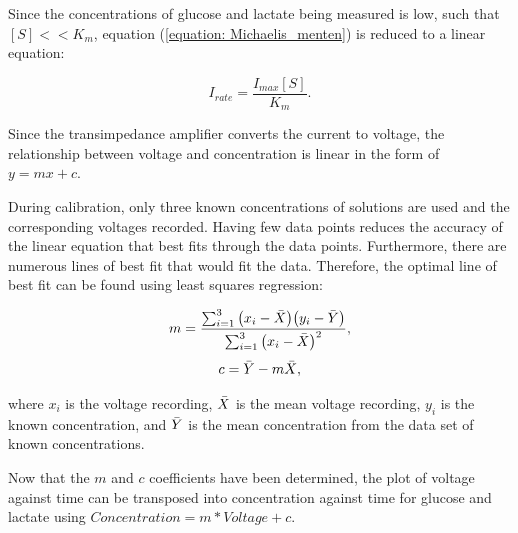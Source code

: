Since the concentrations of glucose and lactate being measured is low, such that $[S] << K_{m}$, equation (\ref{equation: Michaelis_menten}) is reduced to a linear equation:

\begin{equation}
    I_{rate} = \frac{I_{max}[S]}{K_{m}}.
    \label{equation: reduced Michaelis_menten}
\end{equation}

\noindent Since the transimpedance amplifier converts the current to voltage, the relationship between voltage and concentration is linear in the form of $y = mx + c$.

During calibration, only three known concentrations of solutions are used and the corresponding voltages recorded. Having few data points reduces the accuracy of the linear equation that best fits through the data points. Furthermore, there are numerous lines of best fit that would fit the data. Therefore, the optimal line of best fit can be found using least squares regression:

\begin{equation}
    m = \frac{ \sum_{i=1}^{3} \big( x_{i} - \Bar{X} \big) \big( y_{i} - \Bar{Y} \big) }{ \sum_{i=1}^{3} \big( x_{i} - \Bar{X} \big)^{2} },
    \label{equation: least squares regression}
\end{equation}
\begin{equation}
    c = \Bar{Y} - m\Bar{X},
\end{equation}

\noindent where $x_{i}$ is the voltage recording, $\Bar{X}$ is the mean voltage recording, $y_i$ is the known concentration, and $\Bar{Y}$ is the mean concentration from the data set of known concentrations. 

Now that the $m$ and $c$ coefficients have been determined, the plot of voltage against time can be transposed into concentration against time for glucose and lactate using $Concentration = m*Voltage + c$.


